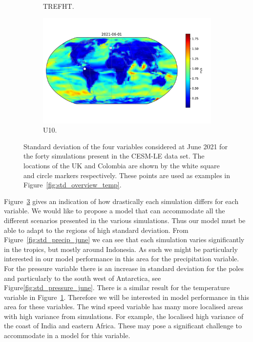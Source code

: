 \begin{figure}[htbp!]
\begin{subfigure}[b]{0.45\textwidth}
		\caption{TREFHT.}
		\label{fig:std_temp_june}   
	\end{subfigure}             
	\begin{subfigure}[b]{0.45\textwidth}
		\includegraphics[width=\textwidth]{U10_std}
		\caption{U10.}
		\label{fig:std_wind_june}
	\end{subfigure}             
	\caption[Spatial overview of variability of Precipitation, Pressure, Temperature, and Wind speed.]{ Standard deviation of the four variables considered at June 2021 for the forty simulations present in the CESM-LE data set. The locations of the UK and Colombia are shown by the white square and circle markers respectively. These points are used as examples in Figure~\ref{fig:std_overview_temp}. }
	\label{fig:std_overview}
\end{figure}

Figure~\ref{fig:std_overview} gives an indication of how drastically each simulation differs for each variable.
We would like to propose a model that can accommodate all the different scenarios presented in the various simulations. 
Thus our model must be able to adapt to the regions of high standard deviation. 
From Figure~\ref{fig:std_precip_june} we can see that each simulation varies significantly in the tropics, but mostly around Indonesia.
As such we might be particularly interested in our model performance in this area for the precipitation variable.
For the pressure variable there is an increase in standard deviation for the poles and particularly to the south west of Antarctica, see Figure\ref{fig:std_pressure_june}.
There is a similar result for the temperature variable in Figure~\ref{fig:std_temp_june}.
Therefore we will be interested in model performance in this area for these variables.
The wind speed variable has many more localised areas with high variance from simulations.
For example, the localised high variance of the coast of India and eastern Africa.  
These may pose a significant challenge to accommodate in a model for this variable.


